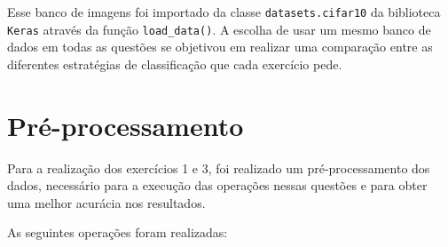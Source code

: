 \documentclass[]{abntex2}
\begin{document}
Esse banco de imagens foi importado da classe \texttt{datasets.cifar10} da biblioteca \texttt{Keras} através da função \texttt{load\_data()}. A escolha de usar um mesmo banco de dados em todas as questões se objetivou em realizar uma comparação entre as diferentes estratégias de classificação que cada exercício pede.




\section*{\textbf{Pré-processamento}}

Para a realização dos exercícios 1 e 3, foi realizado um pré-processamento dos dados, necessário para a execução das operações nessas questões e para obter uma melhor acurácia nos resultados.

As seguintes operações foram realizadas:
\end{document}
